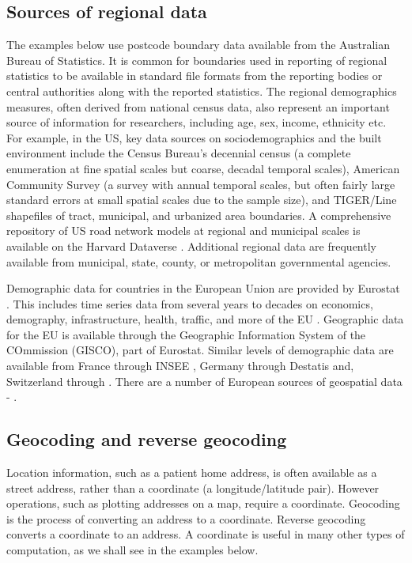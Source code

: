\documentclass[utf8]{frontiersHLTH}
\begin{document}
\subsection{Sources of regional data}\label{sources-of-regional-data}

The examples below use postcode boundary data available from the
Australian Bureau of Statistics. It is common for boundaries used in
reporting of regional statistics to be available in standard file
formats from the reporting bodies or central authorities along with
the reported statistics. The regional demographics measures, often
derived from national census data, also represent an important source
of information for researchers, including age, sex, income, ethnicity
etc.  For example, in the US, key data sources on sociodemographics
and the built environment include the Census Bureau's decennial census
\cite{us_census_bureau_decennial} (a complete enumeration at fine
spatial scales but coarse, decadal temporal scales), American
Community Survey\cite{us_census_bureau_acs} (a survey
with annual temporal scales, but often fairly large standard errors at
small spatial scales due to the sample size), and TIGER/Line
shapefiles\cite{us_census_tiger_line} of tract,
municipal, and urbanized area boundaries. A comprehensive repository 
of US road network models at regional and municipal scales is available
on the Harvard Dataverse \cite{boeing_street_2019}. Additional regional 
data are frequently available from municipal, state, county, or 
metropolitan governmental agencies.

Demographic data for countries in the European Union are provided by
Eurostat \cite{eurostat}. This includes time series data from several
years to decades on economics, demography, infrastructure, health,
traffic, and more of the EU \cite{Lahti2017}. Geographic data for the
EU is available through the Geographic Information System of the
COmmission (GISCO), part of Eurostat. Similar levels of demographic
data are available from France through INSEE \cite{insee}, Germany
through Destatis \cite{destatis} and, Switzerland through
\cite{swiss-bfs}. There are a number of European sources of geospatial
data - \cite{diva-gis,germany-gis,swiss-3d}.

\subsection{Geocoding and reverse
geocoding}\label{geocoding-and-reverse-geocoding}

Location information, such as a patient home address, is often available
as a street address, rather than a coordinate (a longitude/latitude
pair). However operations, such as plotting addresses on a map, require
a coordinate. Geocoding is the process of converting an address to a
coordinate. Reverse geocoding converts a coordinate to an address. A
coordinate is useful in many other types of computation, as we shall see
in the examples below.
\end{document}

